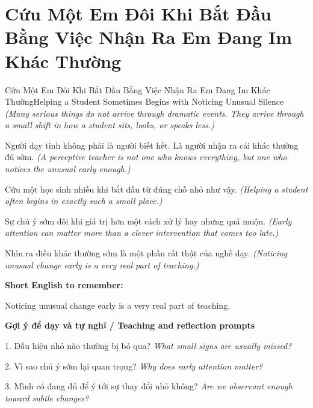 \section{Cứu Một Em Đôi Khi Bắt Đầu Bằng Việc Nhận Ra Em Đang Im Khác Thường}
\begin{truyen}{Cứu Một Em Đôi Khi Bắt Đầu Bằng Việc Nhận Ra Em Đang Im Khác Thường}{Helping a Student Sometimes Begins with Noticing Unusual Silence}
\textit{(Many serious things do not arrive through dramatic events. They arrive through a small shift in how a student sits, looks, or speaks less.)}

Người dạy tinh không phải là người biết hết. Là người nhận ra cái khác thường đủ sớm.
\textit{(A perceptive teacher is not one who knows everything, but one who notices the unusual early enough.)}

Cứu một học sinh nhiều khi bắt đầu từ đúng chỗ nhỏ như vậy.
\textit{(Helping a student often begins in exactly such a small place.)}

Sự chú ý sớm đôi khi giá trị hơn một cách xử lý hay nhưng quá muộn.
\textit{(Early attention can matter more than a clever intervention that comes too late.)}

\end{truyen}

\begin{baihoc}
Nhìn ra điều khác thường sớm là một phần rất thật của nghề dạy.
\textit{(Noticing unusual change early is a very real part of teaching.)}
\end{baihoc}

\begin{ghinhoanh}
\textbf{Short English to remember:}

Noticing unusual change early is a very real part of teaching.

\end{ghinhoanh}

\begin{tuhocnhanh}
\textbf{Gợi ý để dạy và tự nghĩ / Teaching and reflection prompts}

1. Dấu hiệu nhỏ nào thường bị bỏ qua? \textit{What small signs are usually missed?}

2. Vì sao chú ý sớm lại quan trọng? \textit{Why does early attention matter?}

3. Mình có đang đủ để ý tới sự thay đổi nhỏ không? \textit{Are we observant enough toward subtle changes?}
\end{tuhocnhanh}
